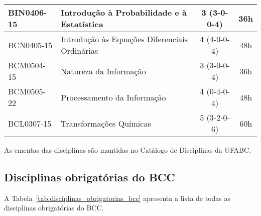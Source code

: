\begin{table}[h!]
\begin{tabular}{|l|p{}|c|c|}
        BIN0406-15 & Introdução à Probabilidade e à Estatística & 3 (3-0-0-4) & 36h\\
        \hline
        BCN0405-15 & Introdução às Equações Diferenciais Ordinárias & 4 (4-0-0-4) & 48h \\
        \hline
        BCM0504-15 & Natureza da Informação & 3 (3-0-0-4) & 36h\\
        \hline
        BCM0505-22 & Processamento da Informação & 4 (0-4-0-4) & 48h\\
        \hline
        BCL0307-15 & Transformações Químicas & 5 (3-2-0-6) & 60h\\
        \hline
    \end{tabular}
\end{table}

As ementas das disciplinas são mantidas no Catálogo de Disciplinas da UFABC.

\subsection{Disciplinas obrigatórias do BCC}
\label{sec:disciplinas_obrigatorais_ementas}

A Tabela~\ref{tab:disciplinas_obrigatorias_bcc} apresenta a lista de todas as
disciplinas obrigatórias do BCC.


